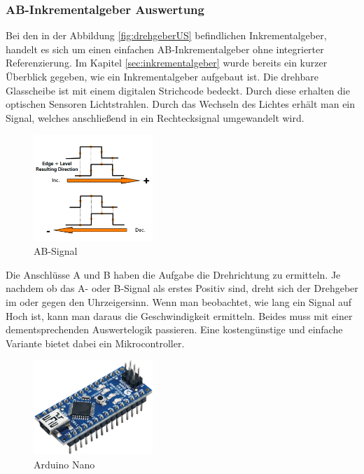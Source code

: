 \subsubsection{AB-Inkrementalgeber Auswertung}
\label{sec:auswertungInkrementalgeber}

Bei den in der Abbildung \ref{fig:drehgeberUS} befindlichen Inkrementalgeber, handelt es sich um einen einfachen AB-Inkrementalgeber ohne integrierter Referenzierung. Im Kapitel \ref{sec:inkrementalgeber} wurde bereits ein kurzer Überblick gegeben, wie ein Inkrementalgeber aufgebaut ist. Die drehbare Glasscheibe ist mit einem digitalen Strichcode bedeckt. Durch diese erhalten die optischen Sensoren Lichtstrahlen. Durch das Wechseln des Lichtes erhält man ein Signal, welches anschließend in ein Rechtecksignal umgewandelt wird. 

\begin{figure}[H]
\begin{center}
	\includegraphics[width=0.4\textwidth]{fig/ABSignal}
	\caption{AB-Signal}
\end{center}
\end{figure}

Die Anschlüsse A und B haben die Aufgabe die Drehrichtung zu ermitteln. Je nachdem ob das A- oder B-Signal als erstes Positiv sind, dreht sich der Drehgeber im oder gegen den Uhrzeigersinn. Wenn man beobachtet, wie lang ein Signal auf Hoch ist, kann man daraus die Geschwindigkeit ermitteln. Beides muss mit einer dementsprechenden Auswertelogik passieren. Eine kostengünstige und einfache Variante bietet dabei ein Mikrocontroller. 

\begin{figure}[H]
\begin{center}
	\includegraphics[width=0.4\textwidth]{fig/nano}
	\caption{Arduino Nano}
\end{center}
\end{figure}

